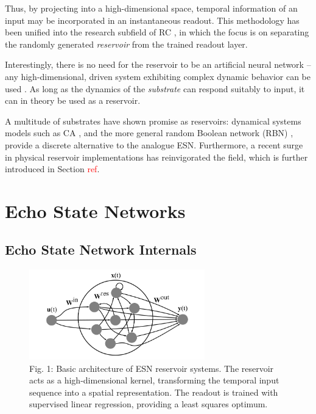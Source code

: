 Thus, by projecting into a high-dimensional space, temporal information of an
input may be incorporated in an instantaneous readout. This methodology has been
unified into the research subfield of RC \cite{schrauwen_overview_2007}, in
which the focus is on separating the randomly generated \textit{reservoir} from
the trained readout layer.

Interestingly, there is no need for the reservoir to be an artificial neural
network -- any high-dimensional, driven system exhibiting complex dynamic
behavior can be used \cite{schrauwen_overview_2007}. As long as the dynamics of
the \textit{substrate} can respond suitably to input, it can in theory be used
as a reservoir.

A multitude of substrates have shown promise as reservoirs: dynamical systems
models such as CA \cite{yilmaz_reservoir_2014}, and the more general random
Boolean network (RBN) \cite{snyder_computational_2013}, provide a discrete
alternative to the analogue ESN. Furthermore, a recent surge in physical
reservoir implementations has reinvigorated the field, which is further
introduced in Section \textcolor{red}{ref}.

\section{Echo State Networks}

\subsection{Echo State Network Internals}


\begin{figure}[t!]
  \centering
  \includegraphics[width=3.0in]{figures/esn.png}
  \caption{
    Fig. 1: Basic architecture of ESN reservoir systems. The reservoir acts as a
high-dimensional kernel, transforming the temporal input sequence into a spatial
representation. The readout is trained with supervised linear regression,
providing a least squares optimum.
  }
  \label{fig:narma10}
\end{figure}

